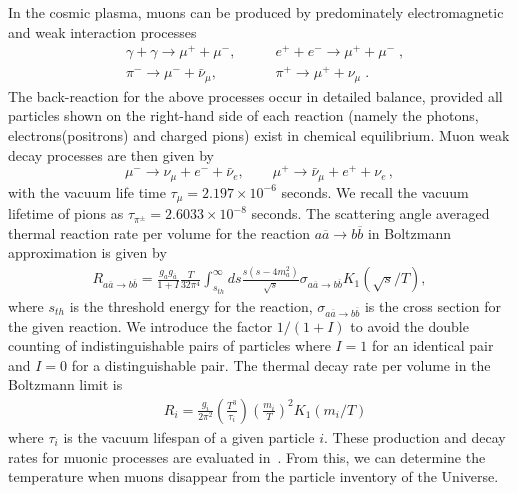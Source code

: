\documentclass[universe,article,submit,moreauthors,pdftex,a4paper]{Definitions/mdpi}
\begin{document}
In the cosmic plasma, muons can be produced by predominately electromagnetic and weak interaction processes
\begin{align} 
&\gamma+\gamma\longrightarrow\mu^++\mu^-,\qquad & e^++e^-\longrightarrow \mu^++\mu^-\;,\\
&\pi^-\longrightarrow\mu^-+\bar{\nu}_\mu,\qquad & \pi^+\longrightarrow\mu^++\nu_\mu\;.
\end{align}
The back-reaction for the above processes occur in detailed balance, provided all particles shown on the right-hand side of each reaction (namely the photons, electrons(positrons) and charged pions) exist in chemical equilibrium. Muon weak decay processes are then given by 
\begin{equation}
\mu^-\rightarrow\nu_\mu+e^-+\bar{\nu}_e,\qquad \mu^+\rightarrow\bar{\nu}_\mu+e^++\nu_e\,,
\end{equation} 
with the vacuum life time $\tau_{\mu}=2.197 \times 10^{-6}$ seconds. We recall the vacuum lifetime of pions as $\tau_{\pi^\pm}=2.6033\times10^{-8}$ seconds. The scattering angle averaged thermal reaction rate per volume for the reaction $a\overline{a}\rightarrow b\overline{b}$ in Boltzmann approximation is given by~\cite{Letessier:2002ony}
\begin{align}\label{pairR}
R_{a\overline{a}\rightarrow b\overline{b}}=\frac{g_ag_{\overline{a}}}{1+I}\frac{T}{32\pi^4}\int_{s_{th}}^\infty ds\frac{s(s-4m^2_a)}{\sqrt{s}}\sigma_{a\overline{a}\rightarrow b\overline{b}} K_1(\sqrt{s}/T),
\end{align}
where $s_{th}$ is the threshold energy for the reaction, $\sigma_{a\overline{a}\rightarrow b\overline{b}}$ is the cross section for the given reaction. We introduce the factor $1/(1+I)$ to avoid the double counting of indistinguishable pairs of particles where $I=1$ for an identical pair and $I=0$ for a distinguishable pair. The thermal decay rate per volume in the Boltzmann limit is~\cite{Kuznetsova:2008jt}
\begin{align}
&R_i=\frac{g_i}{2\pi^2}\left(\frac{T^3}{\tau_i}\right)\left(\frac{m_i}{T}\right)^2K_1(m_i/T) 
\end{align}
where $\tau_i$ is the vacuum lifespan of a given particle $i$. These production and decay rates for muonic processes are evaluated in~\cite{Rafelski:2021aey}. From this, we can determine the temperature when muons disappear from the particle inventory of the Universe. 
\end{document}
